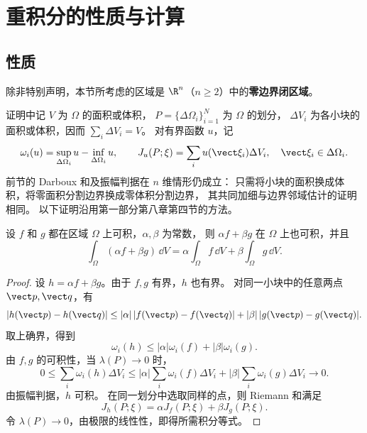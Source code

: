 \section{重积分的性质与计算}

\subsection*{性质}

除非特别声明，本节所考虑的区域是 $\R^n$（$n\ge2$）中的\textbf{零边界闭区域}。

证明中记 $V$ 为 $\Omega$ 的面积或体积，
$P=\{\Delta\Omega_i\}_{i=1}^N$ 为 $\Omega$ 的划分，
$\Delta V_i$ 为各小块的面积或体积，因而 $\sum_i\Delta V_i=V$。
对有界函数 $u$，记
\[
\omega_i(u)=\sup_{\Delta\Omega_i}u-\inf_{\Delta\Omega_i}u,
\qquad
J_u(P;\xi)=\sum_i u(\vect\xi_i)\Delta V_i,
\quad \vect\xi_i\in\Delta\Omega_i.
\]
前节的 Darboux 和及振幅判据在 $n$ 维情形仍成立：
只需将小块的面积换成体积，将零面积分割边界换成零体积分割边界，
其共同加细与边界邻域估计的证明相同。
以下证明沿用第一部分第八章第四节的方法。

\begin{proposition}[线性性]\label{p2-integral-linearity}
设 $f$ 和 $g$ 都在区域 $\Omega$ 上可积，$\alpha,\beta$ 为常数，
则 $\alpha f+\beta g$ 在 $\Omega$ 上也可积，并且
\[
\int_\Omega(\alpha f+\beta g)\,\dd V
=\alpha\int_\Omega f\,\dd V+\beta\int_\Omega g\,\dd V.
\]
\end{proposition}
\begin{proof}
设 $h=\alpha f+\beta g$。由于 $f,g$ 有界，$h$ 也有界。
对同一小块中的任意两点 $\vect p,\vect q$，有
\[
|h(\vect p)-h(\vect q)|
\le|\alpha|\,|f(\vect p)-f(\vect q)|
+|\beta|\,|g(\vect p)-g(\vect q)|.
\]
取上确界，得到
\[
\omega_i(h)\le|\alpha|\omega_i(f)+|\beta|\omega_i(g).
\]
由 $f,g$ 的可积性，当 $\lambda(P)\to0$ 时，
\[
0\le\sum_i\omega_i(h)\Delta V_i
\le|\alpha|\sum_i\omega_i(f)\Delta V_i
+|\beta|\sum_i\omega_i(g)\Delta V_i\longrightarrow0.
\]
由振幅判据，$h$ 可积。
在同一划分中选取同样的点，则 Riemann 和满足
\[
J_h(P;\xi)=\alpha J_f(P;\xi)+\beta J_g(P;\xi).
\]
令 $\lambda(P)\to0$，由极限的线性性，即得所需积分等式。
\end{proof}

